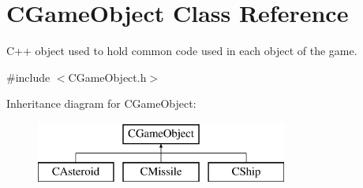 \hypertarget{class_c_game_object}{}\section{C\+Game\+Object Class Reference}
\label{class_c_game_object}


C++ object used to hold common code used in each object of the game.  




{\ttfamily \#include $<$C\+Game\+Object.\+h$>$}

Inheritance diagram for C\+Game\+Object\+:\begin{figure}[H]
\begin{center}
\leavevmode
\includegraphics[height=2.000000cm]{class_c_game_object}
\end{center}
\end{figure}
